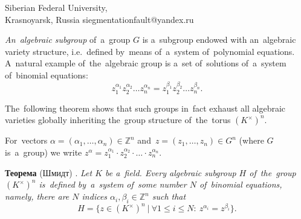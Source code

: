 \documentclass[twoside]{article}
\begin{document}
\maketitBegin %

\author{Nikolay A. Mishko}
{Siberian Federal University,\\
Krasnoyarsk, Russia} {siegmentationfault@yandex.ru}





 \maketitEnd  %


\newcommand{\p}{\partial}
\renewcommand{\geq}{\geqslant}
\renewcommand{\leq}{\leqslant}
\renewcommand{\baselinestretch}{1}
\newtheorem {theorem}{Theorem}[section]
\newtheorem {rem}{Remark}[section]

\renewcommand{\thetheorem}{\arabic{section}.\arabic{theorem}}



\textit{An~algebraic subgroup} of~a~group $G$ is a~subgroup endowed with an~algebraic variety structure,
i.e.~defined by~means of~a~system of~polynomial equations. A~natural example of~the~algebraic group is a~set
of~solutions of~a~system of~binomial equations:
$$
    z_1^{\alpha_1} z_2^{\alpha_2} \ldots z_n^{\alpha_n} = z_1^{\beta_1} z_2^{\beta_2} \ldots z_n^{\beta_n}.
$$

The~following theorem shows that such groups in~fact exhaust all algebraic varieties globally inheriting
the~group structure of~the~torus $(K^\times)^n$.

For~vectors $\alpha = (\alpha_1, \ldots, \alpha_n) \in \mathbb{Z}^n$ and~$z = (z_1, \ldots, z_n) \in G^n$ (where $G$ is~a~group)
we write $z^\alpha = z_1^{\alpha_1} \cdot z_2^{\alpha_2} \cdot \ldots \cdot z_n^{\alpha_n}$.

\medskip\noindent\textbf{Теорема} (Шмидт) \cite{Schm94}. \emph{Let $K$ be a~field. Every algebraic subgroup $H$
    of~the~group $(K^{\times})^n$ is~defined by~a~system of~some number $N$ of~binomial equations, namely,
    there are $N$ indices $\alpha_i, \beta_i \in \mathbb{Z}^n$ such that
    $$
        H = \{ z \in (K^{\times})^n\ |\ \forall 1 \leq i \leq N{:}\ z^{\alpha_i} = z^{\beta_i} \}.
    $$
}
\end{document}
